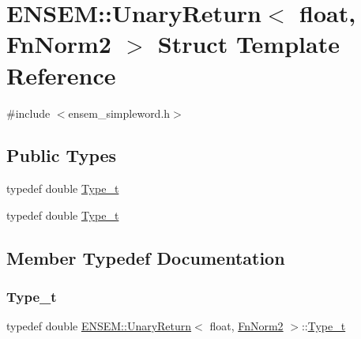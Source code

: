 \hypertarget{structENSEM_1_1UnaryReturn_3_01float_00_01FnNorm2_01_4}{}\section{E\+N\+S\+EM\+:\+:Unary\+Return$<$ float, Fn\+Norm2 $>$ Struct Template Reference}
\label{structENSEM_1_1UnaryReturn_3_01float_00_01FnNorm2_01_4}


{\ttfamily \#include $<$ensem\+\_\+simpleword.\+h$>$}

\subsection*{Public Types}
\begin{DoxyCompactItemize}
\item 
typedef double \mbox{\hyperlink{structENSEM_1_1UnaryReturn_3_01float_00_01FnNorm2_01_4_a5b5cece226a8a8fa27c401904bc8948d}{Type\+\_\+t}}
\item 
typedef double \mbox{\hyperlink{structENSEM_1_1UnaryReturn_3_01float_00_01FnNorm2_01_4_a5b5cece226a8a8fa27c401904bc8948d}{Type\+\_\+t}}
\end{DoxyCompactItemize}


\subsection{Member Typedef Documentation}
\mbox{\label{structENSEM_1_1UnaryReturn_3_01float_00_01FnNorm2_01_4_a5b5cece226a8a8fa27c401904bc8948d}} 
\subsubsection{\texorpdfstring{Type\_t}{Type\_t}\hspace{0.1cm}{\footnotesize\ttfamily [1/2]}}
{\footnotesize\ttfamily typedef double \mbox{\hyperlink{structENSEM_1_1UnaryReturn}{E\+N\+S\+E\+M\+::\+Unary\+Return}}$<$ float, \mbox{\hyperlink{structENSEM_1_1FnNorm2}{Fn\+Norm2}} $>$\+::\mbox{\hyperlink{structENSEM_1_1UnaryReturn_3_01float_00_01FnNorm2_01_4_a5b5cece226a8a8fa27c401904bc8948d}{Type\+\_\+t}}}

